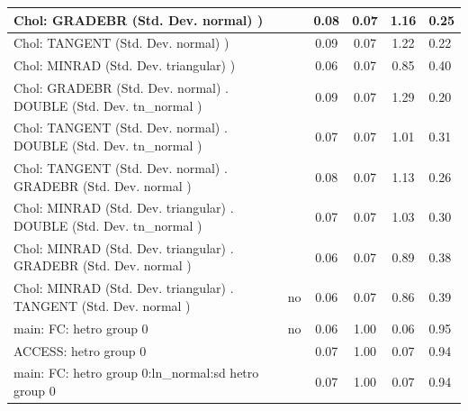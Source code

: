 \begin{table}
\begin{center}
\begin{tabular}{|l|l|c|c|c|l|}
			\hline
			 Chol: GRADEBR (Std. Dev. normal) ) &  & 0.08 & 0.07 & 1.16 & 0.25 \\
			\hline
			 Chol: TANGENT (Std. Dev. normal) ) &  & 0.09 & 0.07 & 1.22 & 0.22 \\
			\hline
			 Chol: MINRAD (Std. Dev. triangular) ) &  & 0.06 & 0.07 & 0.85 & 0.40 \\
			\hline
			 Chol: GRADEBR (Std. Dev. normal) . DOUBLE (Std. Dev.   tn_normal ) &  & 0.09 & 0.07 & 1.29 & 0.20 \\
			\hline
			 Chol: TANGENT (Std. Dev. normal) . DOUBLE (Std. Dev.   tn_normal ) &  & 0.07 & 0.07 & 1.01 & 0.31 \\
			\hline
			 Chol: TANGENT (Std. Dev. normal) . GRADEBR (Std. Dev.   normal ) &  & 0.08 & 0.07 & 1.13 & 0.26 \\
			\hline
			 Chol: MINRAD (Std. Dev. triangular) . DOUBLE (Std. Dev.   tn_normal ) &  & 0.07 & 0.07 & 1.03 & 0.30 \\
			\hline
			 Chol: MINRAD (Std. Dev. triangular) . GRADEBR (Std. Dev.   normal ) &  & 0.06 & 0.07 & 0.89 & 0.38 \\
			\hline
			 Chol: MINRAD (Std. Dev. triangular) . TANGENT (Std. Dev.   normal ) & no & 0.06 & 0.07 & 0.86 & 0.39 \\
			\hline
			main: FC: hetro group 0 & no & 0.06 & 1.00 & 0.06 & 0.95 \\
			\hline
			ACCESS: hetro group 0 &  & 0.07 & 1.00 & 0.07 & 0.94 \\
			\hline
			main: FC: hetro group 0:ln_normal:sd  hetro group 0 &  & 0.07 & 1.00 & 0.07 & 0.94 \\
			\hline
		\end{tabular}
	\end{center}
\end{table}